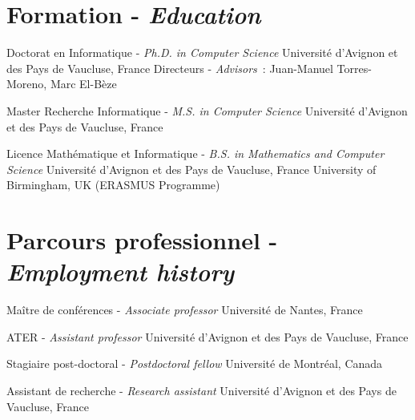 \documentclass[11pt,a4paper]{moderncv}
\begin{document}
\makecvtitle

\setlength{\hintscolumnwidth}{2.2cm}

\section{Formation - \textit{Education}}

        {Doctorat en Informatique - \textit{Ph.D. in Computer Science}}
        {}
        {}{}
        {Université d'Avignon et des Pays de Vaucluse, France \newline
        Directeurs - \textit{Advisors}~: 
        Juan-Manuel Torres-Moreno, Marc El-Bèze}

        {Master Recherche Informatique - \textit{M.S. in Computer Science}}
        {}
        {}{}
        {Université d'Avignon et des Pays de Vaucluse, France}

        {Licence Mathématique et Informatique - \textit{B.S. in Mathematics and
         Computer Science}}
        {}
        {}{}
        {Université d'Avignon et des Pays de Vaucluse, France \newline
        University of Birmingham, UK (ERASMUS Programme)}

\section{Parcours professionnel - \textit{Employment history}}

        {Maître de conférences - \textit{Associate professor}}
        {}
        {}{}
        {Université de Nantes, France}

        {ATER - \textit{Assistant professor}}
        {}
        {}{}
        {Université d'Avignon et des Pays de Vaucluse, France}

        {Stagiaire post-doctoral - \textit{Postdoctoral fellow}}
        {}
        {}{}
        {Université de Montréal, Canada}

        {Assistant de recherche - \textit{Research assistant}}
        {}
        {}{}
        {Université d'Avignon et des Pays de Vaucluse, France}   
\end{document}
